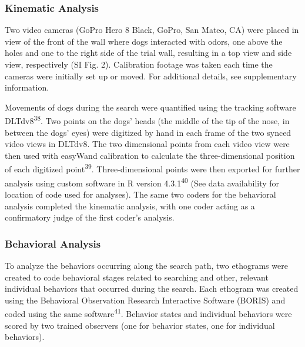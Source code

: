 \documentclass[
]{article}
\begin{document}
\hypertarget{kinematic-analysis}{%
\subsubsection{Kinematic Analysis}\label{kinematic-analysis}}

Two video cameras (GoPro Hero 8 Black, GoPro, San Mateo, CA) were placed in view of the front of the wall where dogs interacted with odors, one above the holes and one to the right side of the trial wall, resulting in a top view and side view, respectively (SI Fig. 2). Calibration footage was taken each time the cameras were initially set up or moved. For additional details, see supplementary information.

Movements of dogs during the search were quantified using the tracking software DLTdv8\textsuperscript{38}. Two points on the dogs' heads (the middle of the tip of the nose, in between the dogs' eyes) were digitized by hand in each frame of the two synced video views in DLTdv8. The two dimensional points from each video view were then used with easyWand calibration to calculate the three-dimensional position of each digitized point\textsuperscript{39}. Three-dimensional points were then exported for further analysis using custom software in R version 4.3.1\textsuperscript{40} (See data availability for location of code used for analyses). The same two coders for the behavioral analysis completed the kinematic analysis, with one coder acting as a confirmatory judge of the first coder's analysis.

\hypertarget{behavioral-analysis}{%
\subsubsection{Behavioral Analysis}\label{behavioral-analysis}}

To analyze the behaviors occurring along the search path, two ethograms were created to code behavioral stages related to searching and other, relevant individual behaviors that occurred during the search. Each ethogram was created using the Behavioral Observation Research Interactive Software (BORIS) and coded using the same software\textsuperscript{41}. Behavior states and individual behaviors were scored by two trained observers (one for behavior states, one for individual behaviors).
\end{document}

